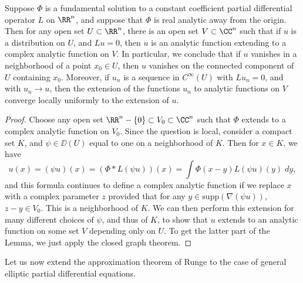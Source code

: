 \begin{lemma}
    Suppose $\Phi$ is a fundamental solution to a constant coefficient partial differential operator $L$ on $\RR^n$, and suppose that $\Phi$ is real analytic away from the origin. Then for any open set $U \subset \RR^n$, there is an open set $V \subset \CC^n$ such that if $u$ is a distribution on $U$, and $Lu = 0$, then $u$ is an analytic function extending to a complex analytic function on $V$. In particular, we conclude that if $u$ vanishes in a neighborhood of a point $x_0 \in U$, then $u$ vanishes on the connected component of $U$ containing $x_0$. Moreover, if $u_n$ is a sequence in $C^\infty(U)$ with $Lu_n = 0$, and with $u_n \to u$, then the extension of the functions $u_n$ to analytic functions on $V$ converge locally uniformly to the extension of $u$.
\end{lemma}
\begin{proof}
    Choose any open set $\RR^n - \{ 0 \} \subset V_0 \subset \CC^n$ such that $\Phi$ extends to a complex analytic function on $V_0$. Since the question is local, consider a compact set $K$, and $\psi \in \DD(U)$ equal to one on a neighborhood of $K$. Then for $x \in K$, we have
    \[ u(x) = (\psi u)(x) = (\Phi * L(\psi u))(x) = \int \Phi(x-y) L(\psi u)(y)\; dy, \]
    and this formula continues to define a complex analytic function if we replace $x$ with a complex parameter $z$ provided that for any $y \in \text{supp}(\nabla (\psi u))$, $z - y \in V_0$. This is a neighborhood of $K$. We can then perform this extension for many different choices of $\psi$, and thus of $K$, to show that $u$ extends to an analytic function on some set $V$ depending only on $U$. To get the latter part of the Lemma, we just apply the closed graph theorem.
\end{proof}

Let us now extend the approximation theorem of Runge to the case of general elliptic partial differential equations.

